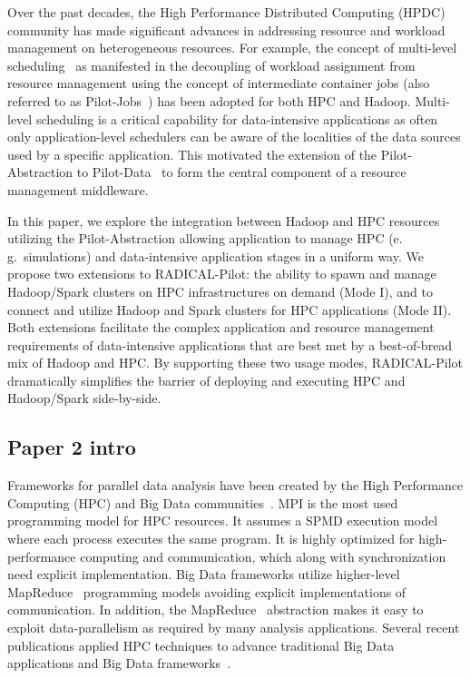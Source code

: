 Over the past decades, the High Performance Distributed Computing (HPDC) community has made significant advances in addressing resource and workload management on heterogeneous resources.
For example, the concept of multi-level scheduling~\cite{1392910} as manifested in the decoupling of workload assignment from resource management using the concept of intermediate container jobs (also referred to as Pilot-Jobs~\cite{pstar12}) has been adopted for both HPC and Hadoop.
Multi-level scheduling is a critical capability for data-intensive applications as often only application-level schedulers can be aware of the localities of the data sources used by a specific application.
This motivated the extension of the Pilot-Abstraction to Pilot-Data~\cite{pilot-data-jpdc-2014} to form the central component of a resource management middleware.

In this paper, we explore the integration between Hadoop and HPC resources utilizing the Pilot-Abstraction allowing application to manage HPC (e.\,g.\ simulations) and data-intensive application stages in a uniform way.
We propose two extensions to RADICAL-Pilot: the ability to spawn and manage Hadoop/Spark clusters on HPC infrastructures on demand (Mode I), and to connect and utilize Hadoop and Spark clusters for HPC applications (Mode II).
Both extensions facilitate the complex application and resource management requirements of data-intensive applications that are best met by a best-of-bread mix of Hadoop and HPC.
By supporting these two usage modes, RADICAL-Pilot dramatically simplifies the barrier of deploying and executing HPC and Hadoop/Spark side-by-side.

\subsection*{Paper 2 intro}
Frameworks for parallel data analysis have been created by the High Performance Computing (HPC) and Big Data communities~\cite{fox-2017}.
MPI is the most used programming model for HPC resources.
It assumes a SPMD execution model where each process executes the same program.
It is highly optimized for high-performance computing and communication, which along with synchronization need explicit implementation.
Big Data frameworks utilize higher-level MapReduce~\cite{mapreduce} programming models avoiding explicit implementations of communication.
In addition, the MapReduce~\cite{mapreduce} abstraction makes it easy to exploit data-parallelism as required by many analysis applications.
Several recent publications applied HPC techniques to advance traditional Big Data applications and Big Data frameworks~\cite{fox-2017}.

